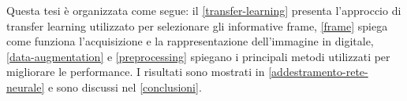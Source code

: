 Questa tesi è organizzata come segue: il \cref{transfer-learning} presenta l'approccio di transfer learning utilizzato per selezionare gli informative frame, \cref{frame} spiega come funziona l'acquisizione e la rappresentazione dell'immagine in digitale, \cref{data-augmentation}  e  \cref{preprocessing} spiegano i principali metodi utilizzati per migliorare le performance. I risultati sono mostrati in \cref{addestramento-rete-neurale} e sono discussi nel \cref{conclusioni}.